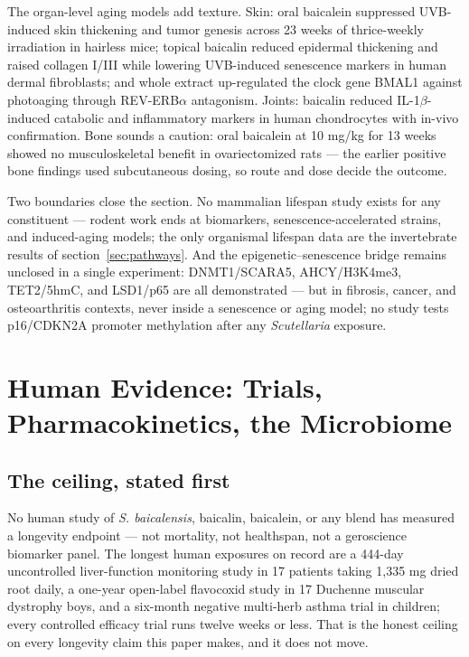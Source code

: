 The organ-level aging models add texture. Skin: oral baicalein suppressed UVB-induced skin thickening and tumor genesis across 23 weeks of thrice-weekly irradiation in hairless mice; topical baicalin reduced epidermal thickening and raised collagen I/III while lowering UVB-induced senescence markers in human dermal fibroblasts; and whole extract up-regulated the clock gene BMAL1 against photoaging through REV-ERB$\alpha$ antagonism. Joints: baicalin reduced IL-1$\beta$-induced catabolic and inflammatory markers in human chondrocytes with in-vivo confirmation. Bone sounds a caution: oral baicalein at 10 mg/kg for 13 weeks showed no musculoskeletal benefit in ovariectomized rats --- the earlier positive bone findings used subcutaneous dosing, so route and dose decide the outcome.

Two boundaries close the section. No mammalian lifespan study exists for any constituent --- rodent work ends at biomarkers, senescence-accelerated strains, and induced-aging models; the only organismal lifespan data are the invertebrate results of section~\ref{sec:pathways}. And the epigenetic--senescence bridge remains unclosed in a single experiment: DNMT1/SCARA5, AHCY/H3K4me3, TET2/5hmC, and LSD1/p65 are all demonstrated --- but in fibrosis, cancer, and osteoarthritis contexts, never inside a senescence or aging model; no study tests p16/CDKN2A promoter methylation after any \textit{Scutellaria} exposure.

\section{Human Evidence: Trials, Pharmacokinetics, the Microbiome}
\label{sec:human}

\subsection{The ceiling, stated first}

No human study of \textit{S. baicalensis}, baicalin, baicalein, or any blend has measured a longevity endpoint --- not mortality, not healthspan, not a geroscience biomarker panel. The longest human exposures on record are a 444-day uncontrolled liver-function monitoring study in 17 patients taking 1{,}335 mg dried root daily, a one-year open-label flavocoxid study in 17 Duchenne muscular dystrophy boys, and a six-month negative multi-herb asthma trial in children; every controlled efficacy trial runs twelve weeks or less. That is the honest ceiling on every longevity claim this paper makes, and it does not move.

